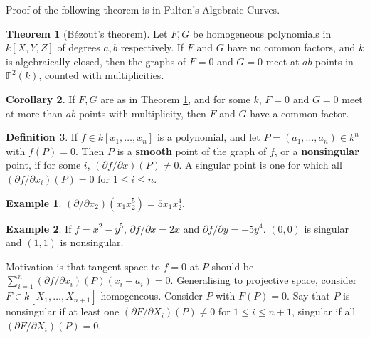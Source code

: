 \documentclass{article}
\renewcommand{\P}{\mathbb{P}}
\newcommand{\rb}[1]{\left( #1 \right)}
\renewcommand{\sb}[1]{\left[ #1 \right]}
\theoremstyle{definition}\newtheorem{definition}{Definition}[section]
\theoremstyle{definition}\newtheorem{remark}[definition]{Remark}
\theoremstyle{definition}\newtheorem*{example}{Example}
\theoremstyle{definition}\newtheorem*{note}{Note}
\newtheorem{theorem}[definition]{Theorem}
\newtheorem{corollary}[definition]{Corollary}
\begin{document}

Proof of the following theorem is in Fulton's Algebraic Curves.

\begin{theorem}[Bézout's theorem]
\label{thm:2.6}
Let $ F, G $ be homogeneous polynomials in $ k\sb{X, Y, Z} $ of degrees $ a, b $ respectively. If $ F $ and $ G $ have no common factors, and $ k $ is algebraically closed, then the graphs of $ F = 0 $ and $ G = 0 $ meet at $ ab $ points in $ \P^2\rb{k} $, counted with multiplicities.
\end{theorem}

\begin{corollary}
If $ F, G $ are as in Theorem \ref{thm:2.6}, and for some $ k $, $ F = 0 $ and $ G = 0 $ meet at more than $ ab $ points with multiplicity, then $ F $ and $ G $ have a common factor.
\end{corollary}

\begin{definition}
If $ f \in k\sb{x_1, \dots, x_n} $ is a polynomial, and let $ P = \rb{a_1, \dots, a_n} \in k^n $ with $ f\rb{P} = 0 $. Then $ P $ is a \textbf{smooth} point of the graph of $ f $, or a \textbf{nonsingular} point, if for some $ i $, $ \rb{\partial f / \partial x}\rb{P} \ne 0 $. A singular point is one for which all $ \rb{\partial f / \partial x_i}\rb{P} = 0 $ for $ 1 \le i \le n $.
\end{definition}

\begin{example}
$ \rb{\partial / \partial x_2}\rb{x_1x_2^5} = 5x_1x_2^4 $.
\end{example}

\begin{example}
If $ f = x^2 - y^5 $, $ \partial f / \partial x = 2x $ and $ \partial f / \partial y = -5y^4 $. $ \rb{0, 0} $ is singular and $ \rb{1, 1} $ is nonsingular.
\end{example}

Motivation is that tangent space to $ f = 0 $ at $ P $ should be $ \sum_{i = 1}^n \rb{\partial f / \partial x_i}\rb{P}\rb{x_i - a_i} = 0 $. Generalising to projective space, consider $ F \in k\sb{X_1, \dots, X_{n + 1}} $ homogeneous. Consider $ P $ with $ F\rb{P} = 0 $. Say that $ P $ is nonsingular if at least one $ \rb{\partial F / \partial X_i}\rb{P} \ne 0 $ for $ 1 \le i \le n + 1 $, singular if all $ \rb{\partial F / \partial X_i}\rb{P} = 0 $.
\end{document}
